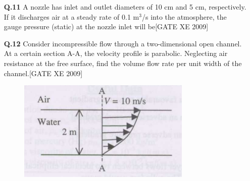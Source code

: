 \documentclass[journal,12pt,onecolumn]{IEEEtran}
\theoremstyle{remark}
\begin{document}
\begin{enumerate}
\vspace{0.3cm}

\item[\textbf{Q.11}] A nozzle has inlet and outlet diameters of 10 cm and 5 cm, respectively. If it discharges air at a steady rate of 0.1 m$^3$/s into the atmosphere, the gauge pressure (static) at the nozzle inlet will be\hfill[GATE XE 2009]

\begin{enumerate}
\end{enumerate}


\vspace{0.3cm}

\item[\textbf{Q.12}] Consider incompressible flow through a two-dimensional open channel. At a certain section A-A, the velocity profile is parabolic. Neglecting air resistance at the free surface, find the volume flow rate per unit width of the channel.\hfill[GATE XE 2009]\\
\begin{figure}[h]
\includegraphics[width=0.5\columnwidth]{figs/fig2.png}
\centering
\end{figure}\\
\begin{enumerate}
\end{enumerate}


\vspace{0.3cm}


\end{enumerate}
\end{document}
